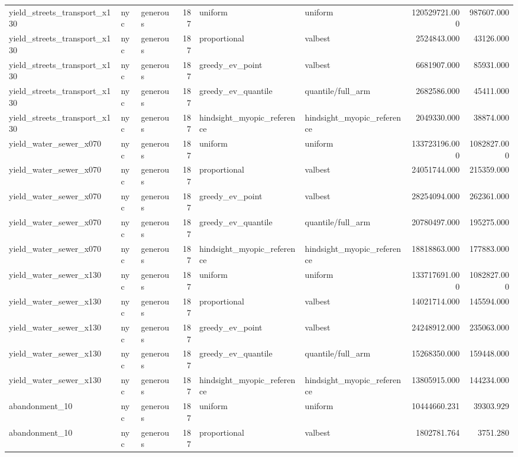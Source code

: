 \begin{tabular}{lllrllrr}
yield\_streets\_transport\_x130 & nyc & generous & 187 & uniform & uniform & 120529721.000 & 987607.000 \\
yield\_streets\_transport\_x130 & nyc & generous & 187 & proportional & valbest & 2524843.000 & 43126.000 \\
yield\_streets\_transport\_x130 & nyc & generous & 187 & greedy\_ev\_point & valbest & 6681907.000 & 85931.000 \\
yield\_streets\_transport\_x130 & nyc & generous & 187 & greedy\_ev\_quantile & quantile/full\_arm & 2682586.000 & 45411.000 \\
yield\_streets\_transport\_x130 & nyc & generous & 187 & hindsight\_myopic\_reference & hindsight\_myopic\_reference & 2049330.000 & 38874.000 \\
yield\_water\_sewer\_x070 & nyc & generous & 187 & uniform & uniform & 133723196.000 & 1082827.000 \\
yield\_water\_sewer\_x070 & nyc & generous & 187 & proportional & valbest & 24051744.000 & 215359.000 \\
yield\_water\_sewer\_x070 & nyc & generous & 187 & greedy\_ev\_point & valbest & 28254094.000 & 262361.000 \\
yield\_water\_sewer\_x070 & nyc & generous & 187 & greedy\_ev\_quantile & quantile/full\_arm & 20780497.000 & 195275.000 \\
yield\_water\_sewer\_x070 & nyc & generous & 187 & hindsight\_myopic\_reference & hindsight\_myopic\_reference & 18818863.000 & 177883.000 \\
yield\_water\_sewer\_x130 & nyc & generous & 187 & uniform & uniform & 133717691.000 & 1082827.000 \\
yield\_water\_sewer\_x130 & nyc & generous & 187 & proportional & valbest & 14021714.000 & 145594.000 \\
yield\_water\_sewer\_x130 & nyc & generous & 187 & greedy\_ev\_point & valbest & 24248912.000 & 235063.000 \\
yield\_water\_sewer\_x130 & nyc & generous & 187 & greedy\_ev\_quantile & quantile/full\_arm & 15268350.000 & 159448.000 \\
yield\_water\_sewer\_x130 & nyc & generous & 187 & hindsight\_myopic\_reference & hindsight\_myopic\_reference & 13805915.000 & 144234.000 \\
abandonment\_10 & nyc & generous & 187 & uniform & uniform & 10444660.231 & 39303.929 \\
abandonment\_10 & nyc & generous & 187 & proportional & valbest & 1802781.764 & 3751.280 \\

\end{tabular}
